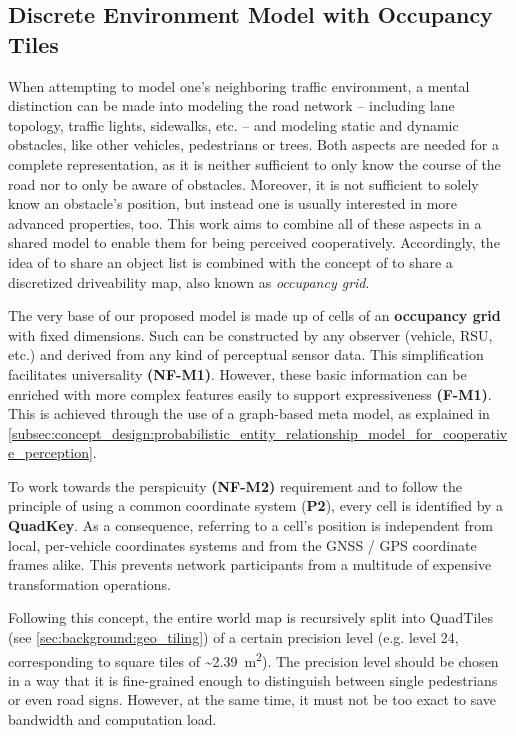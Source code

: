 \subsection{Discrete Environment Model with Occupancy Tiles}
\label{subsec:concept_design:discrete_environment_model_with_occupancy_tiles}

When attempting to model one's neighboring traffic environment, a mental distinction can be made into modeling the road network – including lane topology, traffic lights, sidewalks, etc. – and modeling static and dynamic obstacles, like other vehicles, pedestrians or trees. Both aspects are needed for a complete representation, as it is neither sufficient to only know the course of the road nor to only be aware of obstacles. Moreover, it is not sufficient to solely know an obstacle's position, but instead one is usually interested in more advanced properties, too. This work aims to combine all of these aspects in a shared model to enable them for being perceived cooperatively. Accordingly, the idea of \cite{Rauch2011} to share an object list is combined with the concept of \cite{liu2013motion} to share a discretized driveability map, also known as \textit{occupancy grid}. 
\par
\bigskip

The very base of our proposed model is made up of cells of an \textbf{occupancy grid} with fixed dimensions. Such can be constructed by any observer (vehicle, RSU, etc.) and derived from any kind of perceptual sensor data. This simplification facilitates universality \textbf{(NF-M1)}. However, these basic information can be enriched with more complex features easily to support expressiveness \textbf{(F-M1)}. This is achieved through the use of a graph-based meta model, as explained in \autoref{subsec:concept_design:probabilistic_entity_relationship_model_for_cooperative_perception}.

To work towards the perspicuity \textbf{(NF-M2)} requirement and to follow the principle of using a common coordinate system (\textbf{P2}), every cell is identified by a \textbf{QuadKey}. As a consequence, referring to a cell's position is independent from local, per-vehicle coordinates systems and from the GNSS / GPS coordinate frames alike. This prevents network participants from a multitude of expensive transformation operations.

Following this concept, the entire world map is recursively split into QuadTiles (see \autoref{sec:background:geo_tiling}) of a certain precision level (e.g. level 24, corresponding to square tiles of \textasciitilde\SI{2.39}{\square\meter}). The precision level should be chosen in a way that it is fine-grained enough to distinguish between single pedestrians or even road signs. However, at the same time, it must not be too exact to save bandwidth and computation load.

